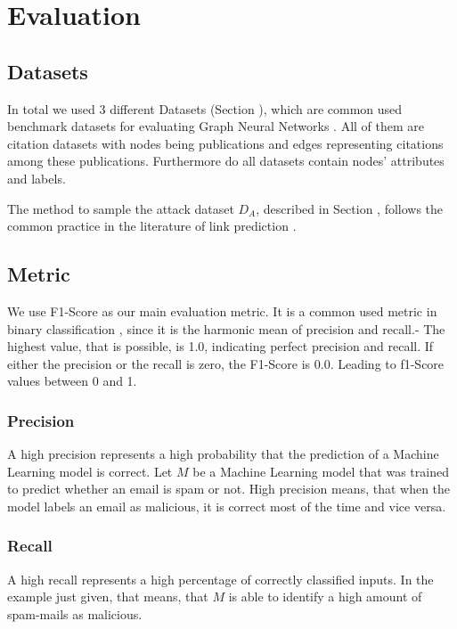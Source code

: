\chapter{Evaluation}

    \section{Datasets}
        In total we used 3 different Datasets (Section ), which are common used benchmark datasets for evaluating Graph Neural Networks \cite{acharya2019feature, gao2019graphnas, gcn}.
        All of them are citation datasets with nodes being publications and edges representing citations among these publications.        
        Furthermore do all datasets contain nodes' attributes and labels.

        The method to sample the attack dataset $D_A$, described in Section , follows the common practice in the literature of link prediction \cite{BHPZ17, grover2016node2vec}.

    \section{Metric}
        We use F1-Score as our main evaluation metric.
        It is a common used metric in binary classification \cite{lipton2014thresholding, santus2016features, woodbridge2016predicting}, since it is the harmonic mean of precision and recall.-
        The highest value, that is possible, is 1.0, indicating perfect precision and recall.
        If either the precision or the recall is zero, the F1-Score is 0.0.
        Leading to f1-Score values between 0 and 1.

        \subsection*{Precision}
            A high precision represents a high probability that the prediction of a Machine Learning model is correct.
            Let $M$ be a Machine Learning model that was trained to predict whether an email is spam or not.
            High precision means, that when the model labels an email as malicious, it is correct most of the time and vice versa.

        \subsection*{Recall}
            A high recall represents a high percentage of correctly classified inputs.
            In the example just given, that means, that $M$ is able to identify a high amount of spam-mails as malicious.

